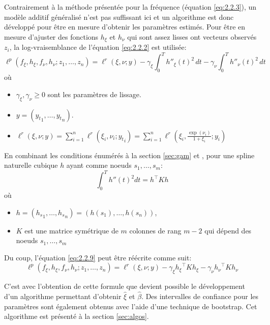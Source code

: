 Contrairement à la méthode présentée pour la fréquence (équation \ref{eq:2.2.3}), un modèle additif généralisé n'est pas suffissant ici et un algorithme est donc développé pour être en mesure d'obtenir les paramètres estimés. Pour être en mesure d'ajuster des fonctions $h_\xi$ et $h_\nu$ qui sont assez lisses ont vecteurs observés $z_i$, la log-vraisemblance de l'équation \ref{eq:2.2.2} est utilisée:
 \begin{equation}\label{eq:2.2.9}
\ell^p({f}_\xi, {h}_\xi, {f}_\nu, {h}_\nu; z_1, \dots, z_n) =  \ell^r(\xi, \nu; y) - \gamma_\xi \int_{0}^{T} h''_\xi(t)^2 \,dt - \gamma_\nu\int_{0}^{T}  h''_\nu(t)^2 \,dt 
\end{equation}
où 
\begin{itemize}
\item $ \gamma_\xi,  \gamma_\nu \geq 0$ sont les paramètres de lissage. 
\item $y=({y_t}_{1}, \dots, {y_t}_{n})$.
\item $\ell^r(\xi, \nu; y) = \sum_{i=1}^{n} \ell^r(\xi_i, \nu_i; {y_t}_{i}) = \sum_{i=1}^{n} \ell^r(\xi_i,\frac{\exp(\nu_i)}{1+\xi_i} ; y_i)$
\end{itemize}


En combinant les conditions énumérés à la section \ref{sec:gam} et \cite[p.~13]{green1993nonparametric}, pour une spline naturelle cubique $h$ ayant comme noeuds $s_1, \dots, s_m$:
\begin{equation}\label{eq:2.2.10}
\int_{0}^{T} h''(t)^2dt = h^{\top} K h
\end{equation}
où 
\begin{itemize}
\item $h=({h_s}_1, \dots, {h_s}_n) = (h(s_1), \dots, h(s_n))$,
\item $K$ est une matrice symétrique de $m$ colonnes de rang $m-2$ qui dépend des noeuds $s_1, \dots, s_m$
\end{itemize}

Du coup, l'équation \ref{eq:2.2.9} peut être réécrite comme suit:
\begin{equation}\label{eq:2.2.11}
\ell^p({f}_\xi, {h}_\xi, {f}_\nu, {h}_\nu; z_1, \dots, z_n) =  \ell^r(\xi, \nu; y) - \gamma_\xi  {h_\xi}^{\top} K {h_\xi} - \gamma_\nu  {h_\nu}^{\top} K {h_\nu}
\end{equation}

C'est avec l'obtention de cette formule que devient possible le développement d'un algorithme permettant d'obtenir $\hat\xi$ et $\hat\beta$.  Des intervalles de confiance pour les paramètres sont également obtenus avec l'aide d'une technique de bootstrap. Cet algorithme est présenté à la section \ref{sec:algos}. 
\\

